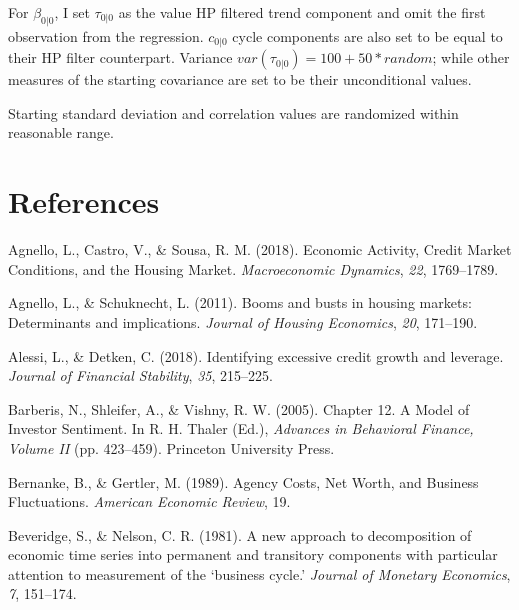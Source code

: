 \documentclass[
  12pt,
]{article}
\newlength{\cslhangindent}
\newlength{\cslentryspacingunit} %
\newenvironment{CSLReferences}[2] %
 {%
  \setlength{\parindent}{0pt}
  \ifodd #1
  \let\oldpar\par
  \def\par{\hangindent=\cslhangindent\oldpar}
  \fi
  \setlength{\parskip}{#2\cslentryspacingunit}
 }%
 {}
\begin{document}
For \(\beta_{0|0}\), I set \(\tau_{0|0}\) as the value HP filtered trend component and omit the first observation from the regression. \(c_{0|0}\) cycle components are also set to be equal to their HP filter counterpart. Variance \(var(\tau_{0|0}) =100+50*random\); while other measures of the starting covariance are set to be their unconditional values.

Starting standard deviation and correlation values are randomized within reasonable range.

\hypertarget{references}{%
\section*{References}\label{references}}

\hypertarget{refs}{}
\begin{CSLReferences}{1}{0}
\leavevmode{}%
Agnello, L., Castro, V., \& Sousa, R. M. (2018). Economic {Activity}, {Credit Market Conditions}, and the {Housing Market}. \emph{Macroeconomic Dynamics}, \emph{22}, 1769--1789.

\leavevmode{}%
Agnello, L., \& Schuknecht, L. (2011). Booms and busts in housing markets: Determinants and implications. \emph{Journal of Housing Economics}, \emph{20}, 171--190.

\leavevmode{}%
Alessi, L., \& Detken, C. (2018). Identifying excessive credit growth and leverage. \emph{Journal of Financial Stability}, \emph{35}, 215--225.

\leavevmode{}%
Barberis, N., Shleifer, A., \& Vishny, R. W. (2005). Chapter 12. {A Model} of {Investor Sentiment}. In R. H. Thaler (Ed.), \emph{Advances in {Behavioral Finance}, {Volume II}} (pp. 423--459). {Princeton University Press}.

\leavevmode{}%
Bernanke, B., \& Gertler, M. (1989). Agency {Costs}, {Net Worth}, and {Business Fluctuations}. \emph{American Economic Review}, 19.

\leavevmode{}%
Beveridge, S., \& Nelson, C. R. (1981). A new approach to decomposition of economic time series into permanent and transitory components with particular attention to measurement of the {`business cycle.'} \emph{Journal of Monetary Economics}, \emph{7}, 151--174.


\end{CSLReferences}
\end{document}
